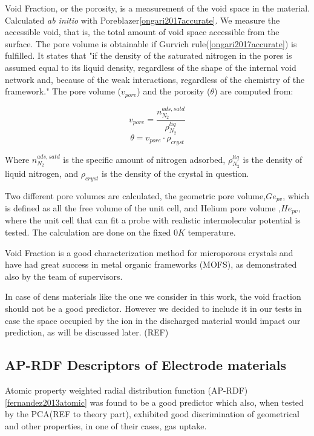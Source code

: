 	Void Fraction, or the porosity, is a measurement of the void space in the material. Calculated \textit{ab initio} with Poreblazer\ref{ongari2017accurate}. We measure the accessible void, that is, the total amount of void space accessible from the surface. The pore volume is obtainable if  Gurvich rule(\ref{ongari2017accurate}) is fulfilled. It states that "if the density of the saturated nitrogen in the pores is assumed equal to its liquid density, regardless of the shape of the internal void network and, because of the  weak interactions, regardless of the chemistry of the framework." The pore volume ($v_{pore}$) and the porosity ($\theta$) are computed from:

\begin{equation}
v_{pore} = \frac{n^{ads,satd}_{N_2}}{\rho^{liq}_{N_2}}
\end{equation}
\begin{equation}
\theta = v_{pore} \cdot \rho_{cryst}
\end{equation} 

	Where $n^{ads,satd}_{N_2}$ is the specific amount of nitrogen adsorbed, $\rho^{liq}_{N_2}$ is the density of liquid nitrogen, and $\rho_{cryst}$ is the density of the crystal in question. 
	
	Two different pore volumes are calculated, the geometric pore volume,$Ge_{pv}$, which is defined as all the free volume of the unit cell, and Helium pore volume ,$He_{pv}$, where the unit cell that can fit a probe with realistic intermolecular potential is tested. The calculation are done on the fixed $0 \si{K}$ temperature. 

	Void Fraction is a good characterization method for microporous crystals and have had great success in metal organic frameworks (MOFS), as demonstrated also by the team of supervisors.
	
	In case of dens materials like the one we consider in this work, the void fraction should not be a good predictor. However we decided to include it in our tests in case the space occupied by the ion in the discharged material would impact our prediction, as will be discussed later. (REF)

\subsection{AP-RDF Descriptors of Electrode materials}

	Atomic property weighted radial distribution function (AP-RDF)\ref{fernandez2013atomic} was found to be a good predictor which also, when tested by the PCA(REF to theory part), exhibited good discrimination of geometrical and other properties, in one of their cases, gas uptake.
	

